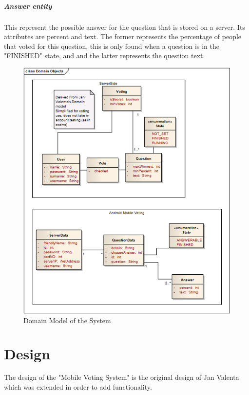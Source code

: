 \documentclass[11pt,twoside,a4paper]{book}
\begin{document}
\paragraph{Answer entity} 
This represent the possible answer for the question that is stored on a server. Its attributes are percent and text. The former represents the percentage of people that voted for this question, this is only found when a question is in the "FINISHED" state, and and the latter represents the question text.





\begin{figure}[h]
\begin{center}
\includegraphics[scale=1]{figures/DomainObjects.png} 
\caption{Domain Model of the System}
\label{fig:Domain Model}
\end{center}
\end{figure}





\chapter{Design}
The design of the "Mobile Voting System" is the original design of Jan Valenta which was extended in order to add functionality.
\end{document}
